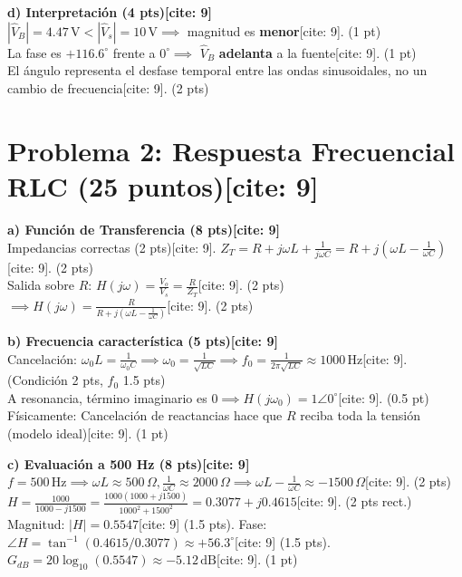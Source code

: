 \documentclass[11pt, a4paper]{article}
\begin{document}
\textbf{d) Interpretación (4 pts)[cite: 9]} \\
$|\hat{V}_B| = 4.47\,\text{V} < |\hat{V}_s| = 10\,\text{V} \implies$ magnitud es \textbf{menor}[cite: 9]. (1 pt) \\
La fase es $+116.6^\circ$ frente a $0^\circ \implies$ $\hat{V}_B$ \textbf{adelanta} a la fuente[cite: 9]. (1 pt) \\
El ángulo representa el desfase temporal entre las ondas sinusoidales, no un cambio de frecuencia[cite: 9]. (2 pts)

\section*{Problema 2: Respuesta Frecuencial RLC (25 puntos)[cite: 9]}

\textbf{a) Función de Transferencia (8 pts)[cite: 9]} \\
Impedancias correctas (2 pts)[cite: 9]. $Z_T = R + j\omega L + \frac{1}{j\omega C} = R + j\left(\omega L - \frac{1}{\omega C}\right)$[cite: 9]. (2 pts) \\
Salida sobre $R$: $H(j\omega) = \frac{V_o}{V_s} = \frac{R}{Z_T}$[cite: 9]. (2 pts) \\
$\implies \boxed{H(j\omega) = \frac{R}{R + j\left(\omega L - \frac{1}{\omega C}\right)}}$[cite: 9]. (2 pts)

\textbf{b) Frecuencia característica (5 pts)[cite: 9]} \\
Cancelación: $\omega_0 L = \frac{1}{\omega_0 C} \implies \omega_0 = \frac{1}{\sqrt{LC}} \implies \boxed{f_0 = \frac{1}{2\pi\sqrt{LC}} \approx 1000\,\text{Hz}}$[cite: 9]. (Condición 2 pts, $f_0$ 1.5 pts) \\
A resonancia, término imaginario es $0 \implies \boxed{H(j\omega_0) = 1\angle0^\circ}$[cite: 9]. (0.5 pt) \\
Físicamente: Cancelación de reactancias hace que $R$ reciba toda la tensión (modelo ideal)[cite: 9]. (1 pt)

\textbf{c) Evaluación a 500 Hz (8 pts)[cite: 9]} \\
$f = 500\,\text{Hz} \implies \omega L \approx 500\,\Omega, \frac{1}{\omega C} \approx 2000\,\Omega \implies \omega L - \frac{1}{\omega C} \approx -1500\,\Omega$[cite: 9]. (2 pts) \\
$H = \frac{1000}{1000 - j1500} = \frac{1000(1000+j1500)}{1000^2+1500^2} = \boxed{0.3077 + j0.4615}$[cite: 9]. (2 pts rect.) \\
Magnitud: $\boxed{|H| = 0.5547}$[cite: 9] (1.5 pts). Fase: $\boxed{\angle H = \tan^{-1}(0.4615/0.3077) \approx +56.3^\circ}$[cite: 9] (1.5 pts). \\
$\boxed{G_{dB} = 20\log_{10}(0.5547) \approx -5.12\,\text{dB}}$[cite: 9]. (1 pt)
\end{document}
